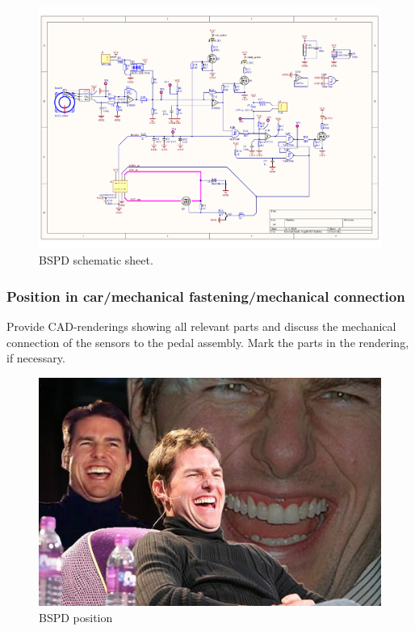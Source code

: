 \begin{figure}[H]
	\centering
	\includegraphics[width=\textwidth]{./img/bspd-schematic.pdf}
	\caption{BSPD schematic sheet.}
	\label{fig:BSPD-schematic}
\end{figure}

\subsubsection{Position in car/mechanical fastening/mechanical connection}
Provide CAD-renderings showing all relevant parts and discuss the mechanical connection of the sensors to the pedal assembly. Mark the parts in the rendering, if necessary.

\begin{figure}[H]
	\centering
	\includegraphics[width=.5\textwidth]{./img/bspd-position.jpg}
	\caption{BSPD position}
	\label{fig:BSPD-position}
\end{figure}
